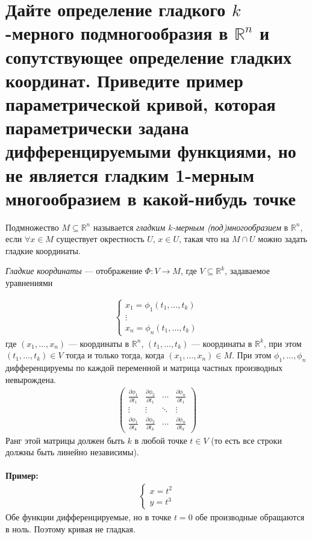 \documentclass{article}
\begin{document}
	\section{Дайте определение гладкого $k$-мерного подмногообразия в $\mathbb{R}^n$ и сопутствующее определение гладких координат. Приведите пример параметрической кривой, которая параметрически задана дифференцируемыми функциями, но не является гладким 1-мерным многообразием в какой-нибудь точке}
\begin{definition}
	Подмножество $M\subseteq \mathbb{R}^n$ называется \textit{гладким $k$-мерным (под)многообразием} в $\mathbb{R}^n$, если $\forall x \in M$ существует окрестность $U$, $x\in U$, такая что на $M \cap U$ можно задать гладкие координаты.
\end{definition}
\begin{definition}
\textit{Гладкие координаты} --- отображение $\Phi: V \xrightarrow{} M$, где $V \subseteq \mathbb{R}^k$, задаваемое уравнениями
\end{definition}
\begin{gather*}
\begin{cases}
    x_1 = \phi_1(t_1, \dotsc, t_k)\\
    \vdots\\
    x_n = \phi_n(t_1, \dotsc, t_k)
\end{cases}
\end{gather*}
где $(x_1, \dotsc, x_n)$ --- координаты в $\mathbb{R}^n$, $(t_1, \dotsc, t_k)$ --- координаты в $\mathbb{R}^k$,
при этом $(t_1, \dotsc, t_k) \in V$ тогда и только тогда, когда $(x_1, \dotsc, x_n)\in M$. При этом $\phi_1,\dotsc,\phi_n$ дифференцируемы по каждой переменной и матрица частных производных невырождена.
\begin{gather*}
\begin{pmatrix}
\frac{\partial \phi_1}{\partial t_1} & \frac{\partial \phi_2}{\partial t_1} & \cdots & \frac{\partial \phi_n}{\partial t_1} \\
\vdots & \vdots & \ddots & \vdots \\
\frac{\partial \phi_1}{\partial t_k} & \frac{\partial \phi_2}{\partial t_k} & \cdots & \frac{\partial \phi_n}{\partial t_k}
\end{pmatrix}
\end{gather*}
Ранг этой матрицы должен быть $k$ в любой точке $t \in V$ (то есть все строки должны быть линейно независимы).
\\\\
\textbf{Пример:}
\begin{gather*}
\begin{cases}
    x=t^2\\
    y=t^3
\end{cases}
\end{gather*}
Обе функции дифференцируемые, но в точке $t=0$ обе производные обращаются в ноль. Поэтому кривая не гладкая.
\end{document}
